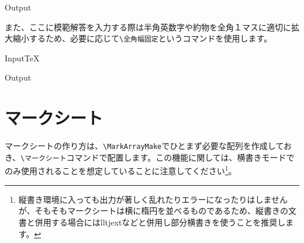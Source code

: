 \documentclass[luatex,fontsize=8pt,paper=b5,twoside]{jlreq}%
\begin{document}
\begin{OutPut}{Output}
\end{OutPut}

また、ここに模範解答を入力する際は半角英数字や約物を全角１マスに適切に拡大縮小するため、必要に応じて\verb|\全角幅固定|というコマンドを使用します。

\begin{SourceCode}{Input}{TeX}
\end{SourceCode}

\begin{OutPut}{Output}
\end{OutPut}

\section{マークシート}
マークシートの作り方は、\verb|\MarkArrayMake|でひとまず必要な配列を作成しておき、\verb|\マークシート|コマンドで配置します。この機能に関しては、横書きモードでのみ使用されることを想定していることに注意してください\footnote{縦書き環境に入っても出力が著しく乱れたりエラーになったりはしませんが、そもそもマークシートは横に楕円を並べるものであるため、縦書きの文書と併用する場合にはlltjextなどと併用し部分横書きを使うことを推奨します。}。
\end{document}
